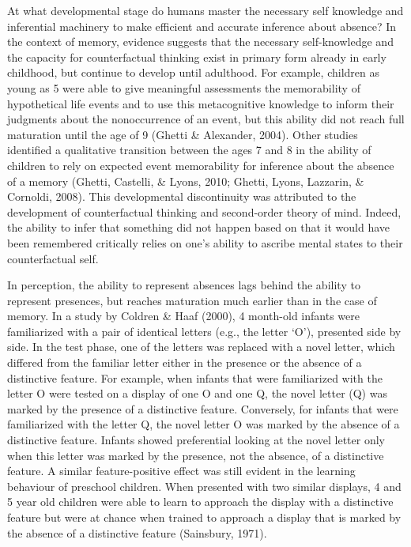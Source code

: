 \documentclass[12pt,twoside]{reedthesis}
\begin{document}
At what developmental stage do humans master the necessary self knowledge and inferential machinery to make efficient and accurate inference about absence? In the context of memory, evidence suggests that the necessary self-knowledge and the capacity for counterfactual thinking exist in primary form already in early childhood, but continue to develop until adulthood. For example, children as young as 5 were able to give meaningful assessments the memorability of hypothetical life events and to use this metacognitive knowledge to inform their judgments about the nonoccurrence of an event, but this ability did not reach full maturation until the age of 9 (Ghetti \& Alexander, 2004). Other studies identified a qualitative transition between the ages 7 and 8 in the ability of children to rely on expected event memorability for inference about the absence of a memory (Ghetti, Castelli, \& Lyons, 2010; Ghetti, Lyons, Lazzarin, \& Cornoldi, 2008). This developmental discontinuity was attributed to the development of counterfactual thinking and second-order theory of mind. Indeed, the ability to infer that something did not happen based on that it would have been remembered critically relies on one's ability to ascribe mental states to their counterfactual self.

In perception, the ability to represent absences lags behind the ability to represent presences, but reaches maturation much earlier than in the case of memory. In a study by Coldren \& Haaf (2000), 4 month-old infants were familiarized with a pair of identical letters (e.g., the letter `O'), presented side by side. In the test phase, one of the letters was replaced with a novel letter, which differed from the familiar letter either in the presence or the absence of a distinctive feature. For example, when infants that were familiarized with the letter O were tested on a display of one O and one Q, the novel letter (Q) was marked by the presence of a distinctive feature. Conversely, for infants that were familiarized with the letter Q, the novel letter O was marked by the absence of a distinctive feature. Infants showed preferential looking at the novel letter only when this letter was marked by the presence, not the absence, of a distinctive feature. A similar feature-positive effect was still evident in the learning behaviour of preschool children. When presented with two similar displays, 4 and 5 year old children were able to learn to approach the display with a distinctive feature but were at chance when trained to approach a display that is marked by the absence of a distinctive feature (Sainsbury, 1971).
\end{document}
